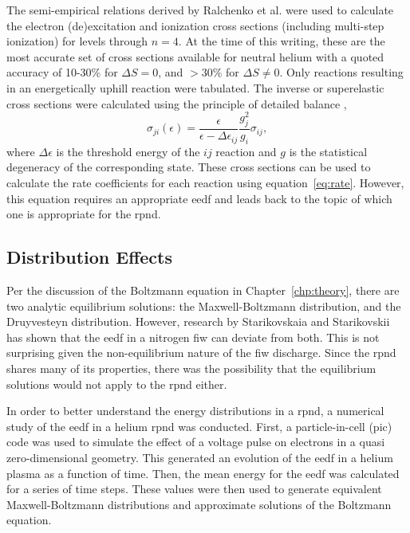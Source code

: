 The semi-empirical relations derived by Ralchenko et al. \cite{Ralchenko2008}
were used to calculate the electron (de)excitation and ionization cross sections
(including multi-step ionization) for levels through $n=4$. At the time of this
writing, these are the most accurate set of cross sections available for neutral
helium with a quoted accuracy of 10-30\% for $\Delta S=0$, and $>30$\% for
$\Delta S \neq 0$. Only reactions resulting in an energetically uphill reaction
were tabulated. The inverse or superelastic cross sections were calculated using
the principle of detailed balance \cite{Kunze2009},
\begin{equation}
  \sigma_{ji}(\epsilon) = \frac{\epsilon}{\epsilon - \Delta\epsilon_{ij}}
    \frac{g_j^2}{g_i}\sigma_{ij},
\end{equation}
where $\Delta\epsilon$ is the threshold energy of the $ij$ reaction and $g$ is
the statistical degeneracy of the corresponding state. These cross sections can
be used to calculate the rate coefficients for each reaction using
equation~\ref{eq:rate}. However, this equation requires an appropriate
\acs{eedf} and leads back to the topic of which one is appropriate for the
\acs{rpnd}.

\subsection{Distribution Effects}\label{sec:dists}

Per the discussion of the Boltzmann equation in Chapter~\ref{chp:theory}, there
are two analytic equilibrium solutions: the Maxwell-Boltzmann distribution, and
the Druyvesteyn distribution. However, research by Starikovskaia and
Starikovskii \cite{Starikovskaia2001a} has shown that the \acs{eedf} in a
nitrogen \acs{fiw} can deviate from both. This is not surprising given the
non-equilibrium nature of the \acs{fiw} discharge. Since the \acs{rpnd} shares
many of its properties, there was the possibility that the equilibrium solutions
would not apply to the \acs{rpnd} either.

In order to better understand the energy distributions in a \acs{rpnd}, a
numerical study of the \acs{eedf} in a helium \acs{rpnd} was conducted. First, a
particle-in-cell (\acs{pic}) code was used to simulate the effect of a voltage
pulse on electrons in a quasi zero-dimensional geometry. This generated an
evolution of the \acs{eedf} in a helium plasma as a function of time. Then, the
mean energy for the \acs{eedf} was calculated for a series of time steps. These
values were then used to generate equivalent Maxwell-Boltzmann distributions and
approximate solutions of the Boltzmann equation.

